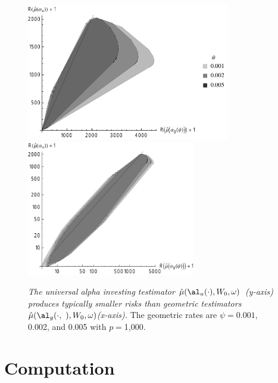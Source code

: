 \documentclass{gSCS2e}
\newcommand{\uTest}{\mbox{$\hat\mu(\al_u(\cdot),W_0,\omega)$}}
\newcommand{\gTest}[1]{\mbox{$\hat\mu(\al_g(\cdot,{#1}),W_0,\omega)$}}
\begin{document}
 \begin{figure}
 \caption{ \label{fig:univGeo} {\sl The universal alpha investing testimator
 \uTest\ (y-axis) produces typically smaller risks than geometric testimators
 \gTest\ (x-axis).}  The geometric rates are $\psi = 0.001$, 0.002, and 0.005 with
 $p=$1,000.}

 \vspace{0.1in}
 \centerline{
     \includegraphics[width=3.5in]{figures/univGeo_bw}
     \includegraphics[width=2.9in]{figures/univGeoLog_bw} }
 \vspace{0.2in}
 \end{figure}



\section{ Computation }
\end{document}
